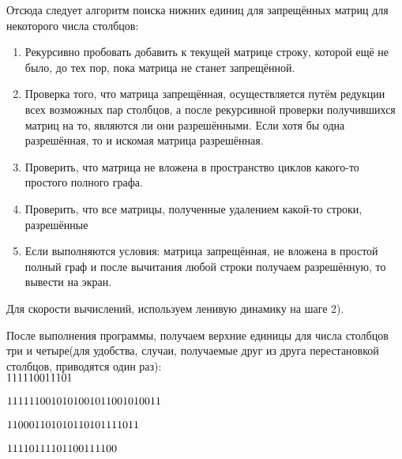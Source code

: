 \documentclass[a4paper]{article}
\theoremstyle{definition}
\begin{document}
Отсюда следует алгоритм поиска нижних единиц для запрещённых матриц для некоторого числа столбцов:

\begin{enumerate}
	\item Рекурсивно пробовать добавить к текущей матрице строку, которой ещё не было, до тех пор, пока матрица не станет запрещённой.
	\item Проверка того, что матрица запрещённая, осуществляется путём редукции всех возможных пар столбцов, а после рекурсивной проверки получившихся матриц на то, являются ли они разрешёнными. Если хотя бы одна разрешённая, то и искомая матрица разрешённая.
	\item Проверить, что матрица не вложена в пространство циклов какого-то простого полного графа.
	\item Проверить, что все матрицы, полученные удалением какой-то строки, разрешённые
	\item Если выполняются условия: матрица запрещённая, не вложена в простой полный граф и после вычитания любой строки получаем разрешённую, то вывести на экран. 
\end{enumerate}

Для скорости вычислений, используем ленивую динамику на шаге 2).

После выполнения программы, получаем верхние единицы для числа столбцов три и четыре(для удобства, случаи, получаемые друг из друга перестановкой столбцов, приводятся один раз):\\
$1 1 1\\
1 1 0\\
0 1 1\\
1 0 1$\\\\
$1 1 1 1\\
1 1 0 0\\
1 0 1 0\\
1 0 0 1\\
0 1 1 0\\
0 1 0 1\\
0 0 1 1$\\\\
$1 1 0 0\\
0 1 1 0\\
1 0 1 0\\
1 1 0 1\\
0 1 1 1\\
1 0 1 1$\\\\
$1 1 1 1\\
0 1 1 1\\
1 0 1 1\\
0 0 1 1\\
1 1 0 0$\\\\
\end{document}
